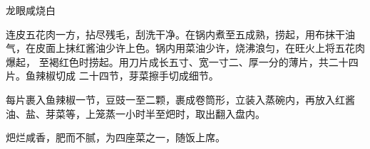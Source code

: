 \begin{recipe}{龙眼咸烧白}

\ingredients


\preparation

\step 连皮五花肉一方，拈尽残毛，刮洗干净。在锅内煮至五成熟，捞起，用布抹干油
气，在皮面上抹红酱油少许上色。锅内用菜油少许，烧沸浪匀，在旺火上将五花肉爆起，
至褐红色时捞起。用刀片成长五寸、宽一寸二、厚一分的薄片，共二十四片。鱼辣椒切成
二十四节，芽菜擦手切成细节。

\step 每片裹入鱼辣椒一节，豆豉一至二颗，裹成卷筒形，立装入蒸碗内，再放入红酱
油、盐、芽菜等，上笼蒸一小时半至𤆵时，取出翻入盘内。

\features

𤆵烂咸香，肥而不腻，为四座菜之一，随饭上席。

\end{recipe}


